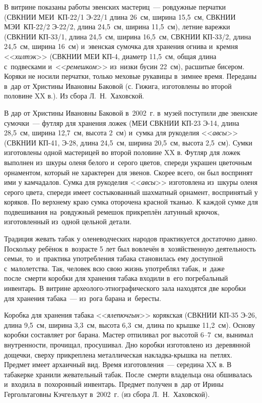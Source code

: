 В витрине показаны работы эвенских мастериц~--- ровдужные перчатки (СВКНИИ МЕИ~КП-22/1 Э-22/1 длина 26~см, ширина 15,5~см, СВКНИИ МЭИ~КП-22/2 Э-22/2, длина 24,5~см, ширина 11,5~см), летние варежки (СВКНИИ КП-33/1, длина 24,5~см, ширина 16,5~см, СВКНИИ КП-33/2, длина 24,5~см, ширина 16~см) и~эвенская сумочка для хранения огнива и~кремня <<\textit{хилтэк}>> (СВКНИИ МЕИ КП-4, диаметр 11,5~см, общая длина с~подвесками и~<<\textit{ремешком}>> из~низки бусин 22~см), расшитые бисером. Коряки не носили перчатки, только меховые рукавицы в~зимнее время. Переданы в~дар от Христины Ивановны Баковой (с. Гижига, изготовлены во второй половине XX в.). Из сбора Л.~Н.~Хаховской.

В дар от Христины Ивановны Баковой в~2002~г. в~музей поступили две эвенские сумочки~--- футляр для хранения ложек (МЕИ СВКНИИ КП-23 Э-14, длина 28,5~см, ширина 12,7~см, высота 2~см) и~сумка для рукоделия <<\textit{авсы}>> (СВКНИИ КП-41, Э-28, длина 24,5~см, ширина 20,5~см, высота 2,5~см). Сумки изготовлены одной мастерицей во второй половине XX в. Футляр для ложек выполнен из~шкуры оленя белого и~серого цветов, спереди украшен цветочным орнаментом, который не характерен для эвенов. Скорее всего, он был воспринят ими у камчадалов. Сумка для рукоделия <<\textit{авсы}>> изготовлена из~шкуры оленя серого цвета, спереди имеет состыкованный шахматный орнамент, воспринятый у коряков. По верхнему краю сумка оторочена красной тканью. К каждой сумке для подвешивания на~ровдужный ремешок прикреплён латунный крючок, изготовленный из~одной цельной детали.

Традиция жевать табак у оленеводческих народов практикуется достаточно давно. Поскольку ребёнок в~возрасте 5 лет был вовлечён в~хозяйственную деятельность семьи, то~и~практика употребления табака становилась ему доступной с~малолетства. Так, человек всю свою жизнь употреблял табак, и~даже после~смерти коробки для хранения табака входили в~его погребальный инвентарь. В витрине археолого-этнографического зала находятся две коробки для хранения табака~--- из~рога барана и~бересты.

Коробка для хранения табака <<\textit{ялепючгын}>> корякская (СВКНИИ КП-35 Э-26, длина 9,5~см, ширина 3,3~см, высота 6,3~см, длина по крышке 11,2~см). Основу коробки составляет рог барана. Мастер отпиливал рог высотой 6--7~см, вынимал внутренности, прочищал, просушивал. Дно коробки изготовлено из~деревянной дощечки, сверху прикреплена металлическая накладка-крышка на~петлях. Предмет имеет архаичный вид. Время изготовления~--- середина XX в. В табакерке хранили жевательный табак. После~смерти владельца она обшивалась и~входила в~похоронный инвентарь. Предмет получен в~дар от Ирины Гергольтаговны Кэчгельхут в~2002~г. (из сбора Л.~Н.~Хаховской).

